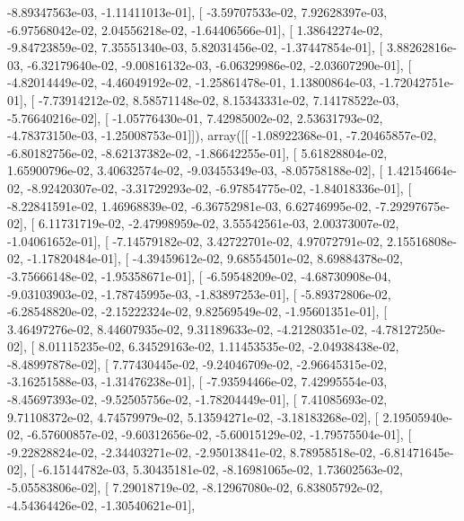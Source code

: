 \documentclass{article}
\begin{document}
         -8.89347563e-03,  -1.11411013e-01],
       [ -3.59707533e-02,   7.92628397e-03,  -6.97568042e-02,
          2.04556218e-02,  -1.64406566e-01],
       [  1.38642274e-02,  -9.84723859e-02,   7.35551340e-03,
          5.82031456e-02,  -1.37447854e-01],
       [  3.88262816e-03,  -6.32179640e-02,  -9.00816132e-03,
         -6.06329986e-02,  -2.03607290e-01],
       [ -4.82014449e-02,  -4.46049192e-02,  -1.25861478e-01,
          1.13800864e-03,  -1.72042751e-01],
       [ -7.73914212e-02,   8.58571148e-02,   8.15343331e-02,
          7.14178522e-03,  -5.76640216e-02],
       [ -1.05776430e-01,   7.42985002e-02,   2.53631793e-02,
         -4.78373150e-03,  -1.25008753e-01]]), array([[ -1.08922368e-01,  -7.20465857e-02,  -6.80182756e-02,
         -8.62137382e-02,  -1.86642255e-01],
       [  5.61828804e-02,   1.65900796e-02,   3.40632574e-02,
         -9.03455349e-03,  -8.05758188e-02],
       [  1.42154664e-02,  -8.92420307e-02,  -3.31729293e-02,
         -6.97854775e-02,  -1.84018336e-01],
       [ -8.22841591e-02,   1.46968839e-02,  -6.36752981e-03,
          6.62746995e-02,  -7.29297675e-02],
       [  6.11731719e-02,  -2.47998959e-02,   3.55542561e-03,
          2.00373007e-02,  -1.04061652e-01],
       [ -7.14579182e-02,   3.42722701e-02,   4.97072791e-02,
          2.15516808e-02,  -1.17820484e-01],
       [ -4.39459612e-02,   9.68554501e-02,   8.69884378e-02,
         -3.75666148e-02,  -1.95358671e-01],
       [ -6.59548209e-02,  -4.68730908e-04,  -9.03103903e-02,
         -1.78745995e-03,  -1.83897253e-01],
       [ -5.89372806e-02,  -6.28548820e-02,  -2.15222324e-02,
          9.82569549e-02,  -1.95601351e-01],
       [  3.46497276e-02,   8.44607935e-02,   9.31189633e-02,
         -4.21280351e-02,  -4.78127250e-02],
       [  8.01115235e-02,   6.34529163e-02,   1.11453535e-02,
         -2.04938438e-02,  -8.48997878e-02],
       [  7.77430445e-02,  -9.24046709e-02,  -2.96645315e-02,
         -3.16251588e-03,  -1.31476238e-01],
       [ -7.93594466e-02,   7.42995554e-03,  -8.45697393e-02,
         -9.52505756e-02,  -1.78204449e-01],
       [  7.41085693e-02,   9.71108372e-02,   4.74579979e-02,
          5.13594271e-02,  -3.18183268e-02],
       [  2.19505940e-02,  -6.57600857e-02,  -9.60312656e-02,
         -5.60015129e-02,  -1.79575504e-01],
       [ -9.22828824e-02,  -2.34403271e-02,  -2.95013841e-02,
          8.78958518e-02,  -6.81471645e-02],
       [ -6.15144782e-03,   5.30435181e-02,  -8.16981065e-02,
          1.73602563e-02,  -5.05583806e-02],
       [  7.29018719e-02,  -8.12967080e-02,   6.83805792e-02,
         -4.54364426e-02,  -1.30540621e-01],
\end{document}
